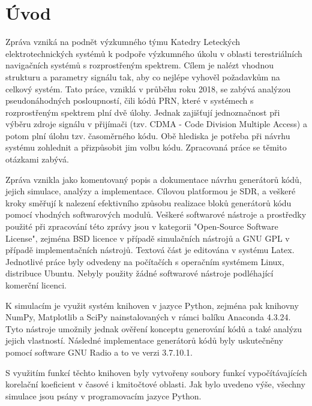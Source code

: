 \section{Úvod}


\marginpar{\textcolor{txt_blue}{Hlavní cíl zprávy}} 
Zpráva vzniká na podnět výzkumného týmu Katedry Leteckých elektrotechnických systémů k podpoře výzkumného úkolu v oblasti terestriálních navigačních systémů s rozprostřeným spektrem. Cílem je nalézt vhodnou strukturu a parametry signálu tak, aby co nejlépe vyhověl požadavkům na celkový systém. Tato práce, vzniklá v průběhu roku 2018, se zabývá analýzou pseudonáhodných posloupností, čili kódů PRN, které v systémech s rozprostřeným spektrem plní dvě úlohy. Jednak zajišťují jednoznačnost při výběru zdroje signálu v přijímači (tzv. CDMA - Code Division Multiple Access) a potom plní úlohu tzv. časoměrného kódu. Obě hlediska je potřeba při návrhu systému zohlednit a přizpůsobit jim volbu kódu. Zpracovaná práce se těmito otázkami zabývá.



\marginpar{\textcolor{txt_blue}{Použité prostředky}} 
Zpráva vznikla jako komentovaný popis a dokumentace návrhu generátorů kódů, jejich simulace, analýzy a implementace. Cílovou platformou je SDR, a veškeré kroky směřují k nalezení efektivního způsobu realizace bloků generátorů kódu pomocí vhodných softwarových modulů. Veškeré softwarové nástroje a prostředky použité při zpracování této zprávy jsou v kategorii "Open-Source Software License", zejména BSD licence v případě simulačních nástrojů a GNU GPL v případě implementačních nástrojů. Textová část je editována v systému Latex. Jednotlivé práce byly odvedeny na počítačích s operačním systémem Linux, distribuce Ubuntu. Nebyly použity žádné softwarové nástroje podléhající komerční licenci.

K simulacím je využit systém knihoven v jazyce Python, zejména pak knihovny NumPy, Matplotlib a SciPy nainstalovaných v rámci balíku Anaconda 4.3.24. Tyto nástroje umožnily jednak ověření konceptu generování kódů a také analýzu jejich vlastností. Následné implementace generátorů kódů byly uskutečněny pomocí software GNU Radio a to ve verzi 3.7.10.1.

S využitím funkcí těchto knihoven byly vytvořeny soubory funkcí vypočítávajících korelační koeficient v časové i kmitočtové oblasti. Jak bylo uvedeno výše, všechny simulace jsou psány v programovacím jazyce Python.


